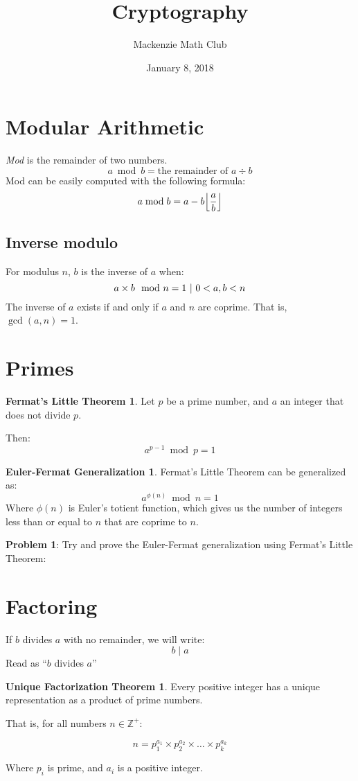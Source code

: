 

\usepackage{amsthm}

\title{Cryptography}
\author{Mackenzie Math Club}
\date{January 8, 2018}


\newcommand{\divides}{\operatorname{|}}

\theoremstyle{definition}
\newtheorem*{fermatLittle}{Fermat's Little Theorem}
\newtheorem*{eulerFermat}{Euler-Fermat Generalization}
\newtheorem*{uniqueFactorization}{Unique Factorization Theorem}


	\section*{Modular Arithmetic}
		\emph{Mod} is the remainder of two numbers.
		\[a \bmod b = \text{the remainder of } a \div b\]
		Mod can be easily computed with the following formula:
		\[a \bmod b = a - b \floor*{\frac{a}{b}}\]
		\subsection*{Inverse modulo}
			For modulus $n$, $b$ is the inverse of $a$ when:
			\[a \times b \mod n = 1 \ |\  0 < a, b < n\]
			The inverse of $a$ exists if and only if $a$ and $n$ are coprime. That is, $\gcd(a, n) = 1$.
	\section*{Primes}
		\begin{fermatLittle}
			Let $p$ be a prime number, and $a$ an integer that does not divide $p$.

			Then:
			\[a^{p-1} \bmod p = 1\]
		\end{fermatLittle}
		\begin{eulerFermat}
			Fermat's Little Theorem can be generalized as:
			\[a^{\phi(n)} \bmod n = 1\]
			Where $\phi(n)$ is Euler's totient function, which gives us the number of integers less than or equal to $n$ that are coprime to $n$.
		\end{eulerFermat}
		\textbf{Problem 1}: Try and prove the Euler-Fermat generalization using Fermat's Little Theorem:
		\solutionspace{1in}
	\section*{Factoring}
		If $b$ divides $a$ with no remainder, we will write:
		\[b \divides a\]
		Read as ``$b$ divides $a$''
		\begin{uniqueFactorization}
			Every positive integer has a unique representation as a product of prime numbers.

			That is, for all numbers $n \in \mathbb{Z}^+$:
			
			\[n = p_1^{a_1} \times p_2^{a_2} \times \dots \times p_k^{a_k}\]

			Where $p_i$ is prime, and $a_i$ is a positive integer.
		\end{uniqueFactorization}
